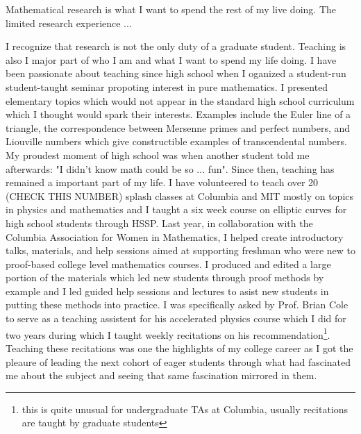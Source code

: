 \documentclass[10pt]{amsart}
\begin{document}
Mathematical research is what I want to spend the rest of my live doing. The limited research experience ... 

\par

I recognize that research is not the only duty of a graduate student. Teaching is also I major part of who I am and what I want to spend my life doing. I have been passionate about teaching since high school when I oganized a student-run student-taught seminar propoting interest in pure mathematics. I presented elementary topics which would not appear in the standard high school curriculum which I thought would spark their interests. Examples include the Euler line of a triangle, the correspondence between Mersenne primes and perfect numbers, and Liouville numbers which give constructible examples of transcendental numbers. My proudest moment of high school was when another student told me afterwards: "I didn't know math could be so ... fun". Since then, teaching has remained a important part of my life. I have volunteered to teach over 20 (CHECK THIS NUMBER) splash classes at Columbia and MIT mostly on topics in physics and mathematics and I taught a six week course on elliptic curves for high school students through HSSP. Last year, in collaboration with the Columbia Association for Women in Mathematics, I helped create introductory talks, materials, and help sessions aimed at supporting freshman who were new to proof-based college level mathematics courses. I produced and edited a large portion of the materials which led new students through proof methods by example and I led guided help sessions and lectures to asist new students in putting these methods into practice. I was specifically asked by Prof. Brian Cole to serve as a teaching assistent for his accelerated physics course which I did for two years during which I taught weekly recitations on his recommendation\footnote{this is quite unusual for undergraduate TAs at Columbia, usually recitations are taught by graduate students}. Teaching these recitations was one the highlights of my college career as I got the pleaure of leading the next cohort of eager students through what had fascinated me about the subject and seeing that same fascination mirrored in them.   
\end{document}
